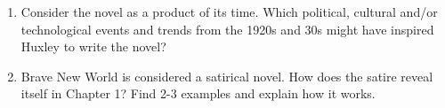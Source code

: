\documentclass[10pt,a4paper,table]{article}
\begin{document}
\begin{enumerate}
\begin{itemize}
    \item human cloning
    \item predestination and conditioning
    \item individuality
    \item control
    \item the political use of technology
    \item something else?
  \end{itemize}
Give reasons for your answer and explain which understanding of these themes you are left with.
\item Consider the novel as a product of its time. Which political, cultural and/or technological events and trends from the 1920s and 30s might have inspired Huxley to write the novel?
\item Brave New World is considered a satirical novel. How does the satire reveal itself in Chapter 1? Find 2-3 examples and explain how it works.
\end{enumerate}
\end{document}
